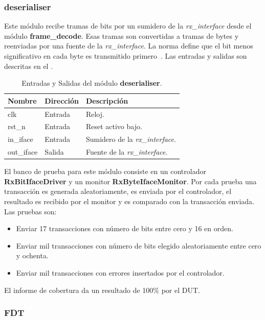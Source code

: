 \documentclass[a4paper, twoside, 11pt]{report}
\begin{document}
\FloatBarrier
\subsubsection{deserialiser}

Este módulo recibe tramas de bits por un sumidero de la \textit{rx\_interface} desde el módulo \textbf{frame\_decode}. Esas tramas son convertidas a tramas de bytes y reenviadas por una fuente de la \textit{rx\_interface}. La norma define que el bit menos significativo en cada byte es transmitido primero~\cite{iso14443-3}. Las entradas y salidas son descritas en el .

\begin{table}[htb]
  \centering
  \tablezebra
  \begin{tabulary}{\linewidth}{l|l|L}
    \textbf{Nombre}&\textbf{Dirección}&\textbf{Descripción} \\
    \hline
    clk&Entrada&Reloj. \\
    rst\_n&Entrada&Reset activo bajo. \\
    in\_iface&Entrada&Sumidero de la \textit{rx\_interface}. \\
    out\_iface&Salida&Fuente de la \textit{rx\_interface}. \\
  \end{tabulary}
  \caption{Entradas y Salidas del módulo \textbf{deserialiser}.}
  \label{tab:ports_deserialiser}
\end{table}

El banco de prueba para este módulo consiste en un controlador \textbf{RxBitIfaceDriver} y un monitor \textbf{RxByteIfaceMonitor}. Por cada prueba una transacción es generada aleatoriamente, es enviada por el controlador, el resultado es recibido por el monitor y es comparado con la transacción enviada. Las pruebas son:

\begin{itemize}
  \item Enviar 17 transacciones con número de bits entre cero y 16 en orden.
  \item Enviar mil transacciones con número de bits elegido aleatoriamente entre cero y ochenta.
  \item Enviar mil transacciones con errores insertados por el controlador.
\end{itemize}

El informe de cobertura da un resultado de 100\% por el DUT.

\FloatBarrier
\subsubsection{FDT}
\label{sec:fdt}
\end{document}
